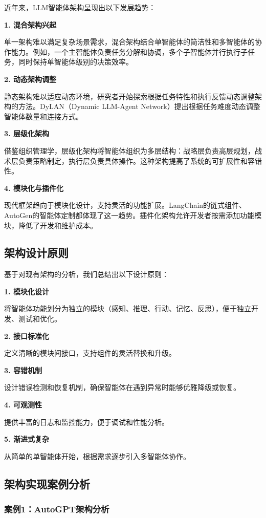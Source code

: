 近年来，LLM智能体架构呈现出以下发展趋势：

\textbf{1. 混合架构兴起}

单一架构难以满足复杂场景需求，混合架构结合单智能体的简洁性和多智能体的协作能力。例如，一个主智能体负责任务分解和协调，多个子智能体并行执行子任务，同时保持单智能体级别的决策效率。

\textbf{2. 动态架构调整}

静态架构难以适应动态环境，研究者开始探索根据任务特性和执行反馈动态调整架构的方法。DyLAN（Dynamic LLM-Agent Network）提出根据任务难度动态调整智能体数量和连接方式。

\textbf{3. 层级化架构}

借鉴组织管理学，层级化架构将智能体组织为多层结构：战略层负责高层规划，战术层负责策略制定，执行层负责具体操作。这种架构提高了系统的可扩展性和容错性。

\textbf{4. 模块化与插件化}

现代框架趋向于模块化设计，支持灵活的功能扩展。LangChain的链式组件、AutoGen的智能体定制都体现了这一趋势。插件化架构允许开发者按需添加功能模块，降低了开发和维护成本。

\subsection{架构设计原则}

基于对现有架构的分析，我们总结出以下设计原则：

\textbf{1. 模块化设计}

将智能体功能划分为独立的模块（感知、推理、行动、记忆、反思），便于独立开发、测试和优化。

\textbf{2. 接口标准化}

定义清晰的模块间接口，支持组件的灵活替换和升级。

\textbf{3. 容错机制}

设计错误检测和恢复机制，确保智能体在遇到异常时能够优雅降级或恢复。

\textbf{4. 可观测性}

提供丰富的日志和监控能力，便于调试和性能分析。

\textbf{5. 渐进式复杂}

从简单的单智能体开始，根据需求逐步引入多智能体协作。

\subsection{架构实现案例分析}

\subsubsection{案例1：AutoGPT架构分析}

